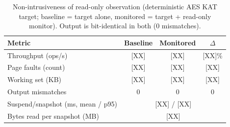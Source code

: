 \begin{table}[t]
\centering
\caption{Non-intrusiveness of read-only observation (deterministic AES KAT target; baseline
= target alone, monitored = target + read-only monitor). Output is bit-identical in both
(0 mismatches).}
\label{tab:perturbation}
\scriptsize
\begin{tabular}{@{}lccc@{}}
\toprule
\textbf{Metric} & \textbf{Baseline} & \textbf{Monitored} & \textbf{$\Delta$} \\
\midrule
Throughput (ops/s)        & [XX] & [XX] & [XX]\% \\
Page faults (count)       & [XX] & [XX] & [XX] \\
Working set (KB)          & [XX] & [XX] & [XX] \\
Output mismatches         & 0    & 0    & 0 \\
\midrule
Suspend/snapshot (ms, mean / p95) & \multicolumn{3}{c}{[XX] / [XX]} \\
Bytes read per snapshot (MB)      & \multicolumn{3}{c}{[XX]} \\
\bottomrule
\end{tabular}
\end{table}
